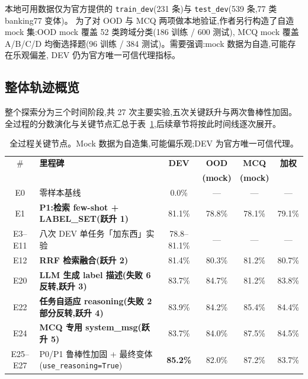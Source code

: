 \documentclass[11pt,a4paper]{ctexart}
\begin{document}
本地可用数据仅为官方提供的 \texttt{train\_dev}(231 条)与 \texttt{test\_dev}(539 条,77 类 banking77 变体)。
为了对 OOD 与 MCQ 两项做本地验证,作者另行构造了自造 mock 集:OOD mock 覆盖 52 类跨域分类(186 训练 / 600 测试),
MCQ mock 覆盖 A/B/C/D 均衡选择题(96 训练 / 384 测试)。需要强调:mock 数据为自造,可能存在乐观偏差,
DEV 仍为官方唯一可信代理指标。

\subsection{整体轨迹概览}

整个探索分为三个时间阶段,共 27 次主要实验,五次关键跃升与两次鲁棒性加固。
全过程的分数演化与关键节点汇总于表~\ref{tab:overview},后续章节将按此时间线逐次展开。

\begin{table}[h]
\centering
\small
\renewcommand{\arraystretch}{1.25}
\begin{tabularx}{\linewidth}{@{}cXcccc@{}}
\toprule
\# & \textbf{里程碑} & \textbf{DEV} & \textbf{OOD} & \textbf{MCQ} & \textbf{加权} \\
 &  &  & \textbf{(mock)} & \textbf{(mock)} &  \\
\midrule
E0  & 零样本基线                                                 & 0.0\%   & —      & —      & —      \\
E1  & \textbf{P1:检索 few-shot + LABEL\_SET(跃升 1)}            & 81.1\%  & 78.8\% & 78.1\% & 79.1\% \\
E3--E11 & 八次 DEV 单任务「加东西」实验                           & 78.8--81.1\% & — & — & —      \\
E12 & \textbf{RRF 检索融合(跃升 2)}                              & 81.4\%  & 80.3\% & 81.2\% & 80.7\% \\
E20 & \textbf{LLM 生成 label 描述(失败 6 反转,跃升 3)}           & 83.7\%  & 84.7\% & 81.2\% & 83.8\% \\
E22 & \textbf{任务自适应 reasoning(失败 2 部分反转,跃升 4)}       & 83.9\%  & 84.2\% & 85.4\% & 84.4\% \\
E24 & \textbf{MCQ 专用 system\_msg(跃升 5)}                      & 83.7\%  & 84.0\% & 87.5\% & 84.5\% \\
E25--E27 & P0/P1 鲁棒性加固 + 最终变体(\texttt{use\_reasoning=True}) & \textbf{85.2\%} & 82.0\% & 87.2\% & 83.7\% \\
\bottomrule
\end{tabularx}
\caption{全过程关键节点。Mock 数据为自造集,可能偏乐观;DEV 为官方唯一可信代理。}
\label{tab:overview}
\end{table}
\end{document}
